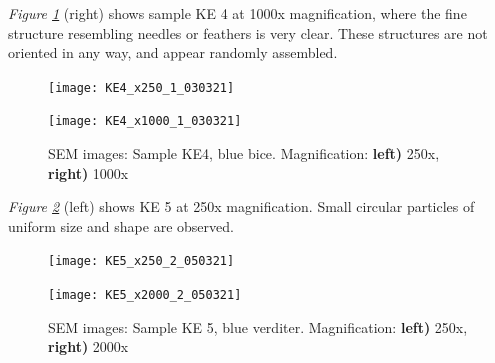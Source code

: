 \textit{Figure \ref{fig:KE4_sem_2}} (right) shows sample KE 4 at 1000x magnification, where the fine structure resembling needles or feathers is very clear. These structures are not oriented in any way, and appear randomly assembled.

\begin{figure}[H]
\centering
\begin{minipage}{.45\textwidth}
  \centering
  \texttt{[image: KE4\_x250\_1\_030321]}
\end{minipage}
\begin{minipage}{.45\textwidth}
  \centering
  \texttt{[image: KE4\_x1000\_1\_030321]}
\end{minipage}
\caption[SEM images: Sample KE4, blue bice]{SEM images: Sample KE4, blue bice. Magnification: \textbf{left)} 250x, \textbf{right)} 1000x}
\label{fig:KE4_sem_2}
\end{figure}


\textit{Figure \ref{fig:KE5_sem_2}} (left) shows KE 5 at 250x magnification. Small circular particles of uniform size and shape are observed.

\begin{figure}[H]
\centering
\begin{minipage}{.45\textwidth}
  \centering
  \texttt{[image: KE5\_x250\_2\_050321]}
\end{minipage}
\begin{minipage}{.45\textwidth}
  \centering
  \texttt{[image: KE5\_x2000\_2\_050321]}
\end{minipage}
\caption[SEM images: Sample KE 5, blue verditer]{SEM images: Sample KE 5, blue verditer. Magnification: \textbf{left)} 250x, \textbf{right)} 2000x}
\label{fig:KE5_sem_2}
\end{figure}

